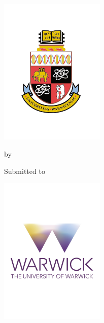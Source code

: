 \begin{titlepage}
\begin{center}
\includegraphics[width=5cm]{Warwick_Crest.pdf} 

\vspace*{10pt}
\begin{spacing}{2}
\begin{center}
{\Large \bf \TheTitle} %

\vspace*{-8pt}

by

{\Large \bf \TheAuthor} %


\vspace*{8pt}

{\large \bf \TheModule} %


Submitted to \TheUni %

\vspace*{16pt}
{\Large \bf \TheDept} %

\TheSubDate %

\vspace*{24pt}
\includegraphics[width=5cm]{warwick_logo.pdf} 


\end{center}
\end{spacing}
\end{center}
\end{titlepage}
